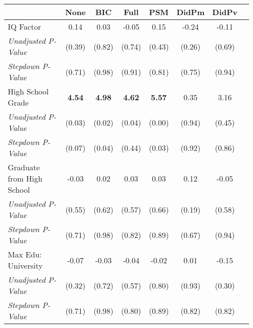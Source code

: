 \begin{tabular}{l c c c c c c c}
\toprule
 & None & BIC & Full & PSM & DidPm & DidPv \\
\midrule
IQ Factor & 0.14 & 0.03 & -0.05 & 0.15 & -0.24 & -0.11 \\
\quad \textit{Unadjusted P-Value} & (0.39) & (0.82) & (0.74) & (0.43) & (0.26) & (0.69) \\
\quad \textit{Stepdown P-Value} & (0.71) & (0.98) & (0.91) & (0.81) & (0.75) & (0.94) \\
High School Grade & \textbf{ 4.54 } & \textbf{ 4.98 } & \textbf{ 4.62 } & \textbf{ 5.57 } & 0.35 & 3.16 \\
\quad \textit{Unadjusted P-Value} & (0.03) & (0.02) & (0.04) & (0.00) & (0.94) & (0.45) \\
\quad \textit{Stepdown P-Value} & (0.07) & (0.04) & (0.44) & (0.03) & (0.92) & (0.86) \\
Graduate from High School & -0.03 & 0.02 & 0.03 & 0.03 & 0.12 & -0.05 \\
\quad \textit{Unadjusted P-Value} & (0.55) & (0.62) & (0.57) & (0.66) & (0.19) & (0.58) \\
\quad \textit{Stepdown P-Value} & (0.71) & (0.98) & (0.82) & (0.89) & (0.67) & (0.94) \\
Max Edu: University & -0.07 & -0.03 & -0.04 & -0.02 & 0.01 & -0.15 \\
\quad \textit{Unadjusted P-Value} & (0.32) & (0.72) & (0.57) & (0.80) & (0.93) & (0.30) \\
\quad \textit{Stepdown P-Value} & (0.71) & (0.98) & (0.80) & (0.89) & (0.82) & (0.82) \\
\bottomrule
\end{tabular}
